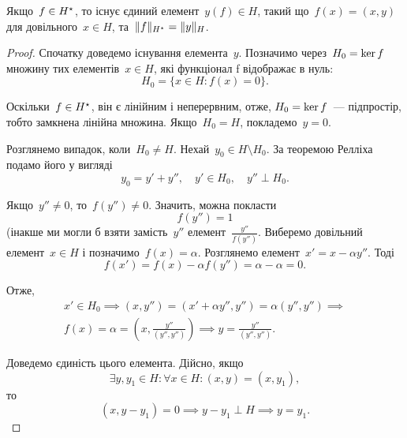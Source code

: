 \begin{theorem}[Рісса]
    Якщо~$f \in H^\star$, то існує єдиний елемент~$y(f) \in H$, такий що~$f(x) = (x, y)$ для довільного~$x \in H$, та~$\|f\|_{H^\star} = \|y\|_H$.
\end{theorem}

\begin{proof}
    Спочатку доведемо існування елемента~$y$. Позначимо через~$H_0 = \operatorname{ker} f$ множину тих елементів~$x \in H$, які функціонал f відображає в нуль:
    \begin{equation*}
        H_0 = \{x \in H: f(x) = 0\}.
    \end{equation*}

    Оскільки~$f \in H^\star$, він є лінійним і неперервним, отже, $H_0 = \operatorname{ker} f$~--- підпростір, тобто замкнена лінійна множина. Якщо~$H_0 = H$, покладемо~$y = 0$.

    Розглянемо випадок, коли~$H_0 \ne H$. Нехай~$y_0 \in H \setminus H_0$. За теоремою Релліха подамо його у вигляді 
    \begin{equation*}
        y_0 = y' + y'', \quad y' \in H_0, \quad y'' \perp H_0.
    \end{equation*}

    Якщо~$y'' \ne 0$, то~$f(y'') \ne 0$. Значить, можна покласти
    \begin{equation*}
        f(y'') = 1
    \end{equation*}
    (інакше ми могли б взяти замість~$y''$ елемент~$\frac{y''}{f(y'')}$. Виберемо довільний елемент~$x \in H$ і позначимо~$f(x) = \alpha$. Розглянемо елемент~$x' = x - \alpha y''$. Тоді
    \begin{equation*}
        f(x') = f(x) - \alpha f(y'') = \alpha - \alpha = 0.    
    \end{equation*}

    Отже,
    \begin{multline*}
        x' \in H_0 \implies (x, y'') = (x' + \alpha y'', y'') = \alpha (y'', y'') \implies \\
        f(x) = \alpha = \left( x, \frac{y''}{(y'', y'')} \right) \implies y = \frac{y''}{(y'', y'')}.
    \end{multline*}

    Доведемо єдиність цього елемента. Дійсно, якщо
    \begin{equation*}
        \exists y, y_1 \in H: \forall x \in H: (x, y) = (x, y_1),
    \end{equation*}
    то
    \begin{equation*}
        (x, y - y_1) = 0 \implies y - y_1 \perp H \implies y = y_1.
    \end{equation*}
    

\end{proof}

